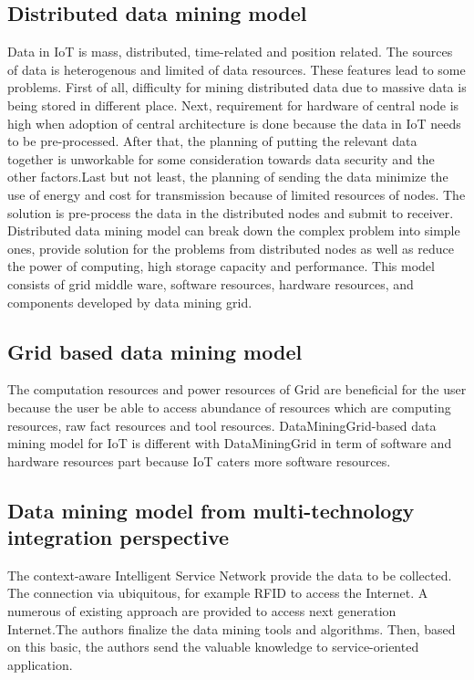 \documentclass[a4paper,12pt]{article}
\begin{document}
{\subsection{Distributed data mining model}
Data in IoT is mass, distributed, time-related and position related. The sources of data is heterogenous and limited of data resources. These features lead to some problems. First of all, difficulty for mining distributed data due to massive data is being stored in different place. Next, requirement for hardware of central node is high when adoption of central architecture is done because the data in IoT needs to be pre-processed. After that, the planning of putting the relevant data together is unworkable for some consideration towards data security and the other factors.Last but not least, the planning of sending the data minimize the use of energy and cost for transmission because of limited resources of nodes. The solution is pre-process the data in the distributed nodes and submit to receiver. \\
\indent 
Distributed data mining model can break down the complex problem into simple ones, provide solution for the problems from distributed nodes as well as reduce the power of computing, high storage capacity and performance. This model consists of grid middle ware, software resources, hardware resources, and components developed by data mining grid.
\subsection{Grid based data mining model}
The computation resources and power resources of Grid are beneficial for the user because the user be able to access abundance of resources which are computing resources, raw fact resources and tool resources.  DataMiningGrid-based data mining model for IoT is different with DataMiningGrid in term of software and hardware resources part because IoT caters more software resources.
\subsection{Data mining model from multi-technology integration perspective}
The context-aware Intelligent Service Network provide the data to be collected. The connection via ubiquitous, for example RFID to access the Internet. A numerous of existing approach are provided to access next generation Internet.The authors finalize the data mining tools and algorithms. Then, based on this basic, the authors send the valuable knowledge to service-oriented application.
}
\end{document}
